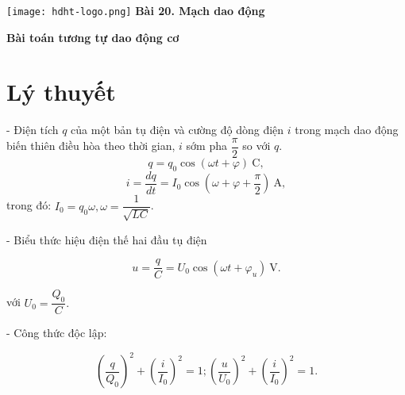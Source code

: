 \newcommand{\chapter}[2][]{
	\newcommand{\chapname}{#2}
	\begin{flushleft}
		\begin{minipage}[t]{\linewidth}
			\texttt{[image: hdht-logo.png]}
			\hspace{0pt}	
			\sffamily\bfseries\large Bài  20. Mạch dao động
			\begin{flushleft}
				\huge\bfseries #1
			\end{flushleft}
		\end{minipage}
	\end{flushleft}
	\vspace{1cm}
	\normalfont\normalsize
}
\chapter[ Bài toán tương tự dao động cơ]{ Bài toán tương tự dao động cơ}
\section{Lý thuyết}
- Điện tích $q$ của một bản tụ điện và cường độ dòng điện $i$ trong mạch dao động biến thiên điều hòa theo thời gian, $i$ sớm pha $\dfrac{\pi}{2} $ so với $q$.
\begin{equation}
	q=q_0\cos(\omega t +\varphi)\ \text{C}, 
\end{equation}
\begin{equation}
	i=\frac{dq}{dt}=I_0 \cos(\omega +\varphi+ \frac{\pi}{2})\ \text{A},
\end{equation}
trong đó: $I_0=q_0\omega, \omega =\dfrac{1}{\sqrt {LC}}$.

- Biểu thức hiệu điện thế hai đầu tụ điện

$$ u = \dfrac{q}{C} = U_0 \cos (\omega t + \varphi_u)\ \text{V}.$$

với $U_0 =\dfrac{Q_0}{C}.$

- Công thức độc lập:

$$ \left(\dfrac{q}{Q_0}\right)^2 +  \left(\dfrac{i}{I_0}\right)^2 =1; \left(\dfrac{u}{U_0}\right)^2 +  \left(\dfrac{i}{I_0}\right)^2 =1.$$


